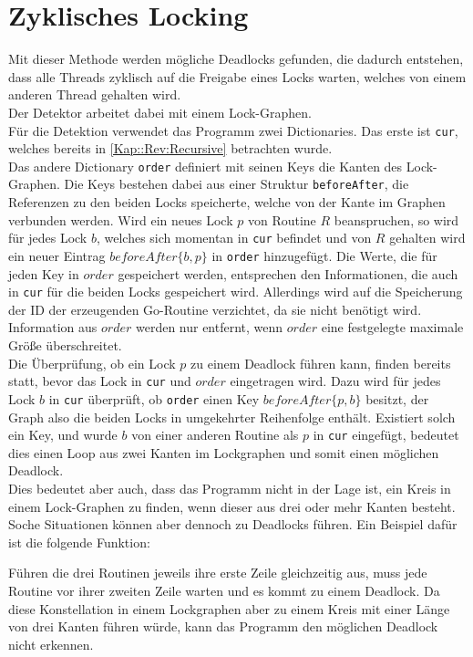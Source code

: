 \section{Zyklisches Locking}\label{Kap::Rev:Cyclic}
Mit dieser Methode werden mögliche Deadlocks gefunden, die dadurch entstehen,
dass alle Threads zyklisch auf die Freigabe eines Locks warten, welches von 
einem anderen Thread gehalten wird.\\ 
Der Detektor arbeitet dabei mit einem Lock-Graphen.\\
Für die Detektion verwendet das Programm zwei Dictionaries. Das erste ist \texttt{cur}, 
welches bereits in \ref{Kap::Rev:Recursive} betrachten wurde.\\
Das andere Dictionary \texttt{order} definiert mit seinen Keys die Kanten des Lock-Graphen.
Die Keys bestehen dabei aus einer Struktur \texttt{beforeAfter}, die Referenzen zu den beiden
Locks speicherte, welche von der Kante im Graphen verbunden werden.
Wird ein neues Lock $p$ von Routine $R$ beanspruchen, so wird für 
jedes Lock $b$, welches sich momentan in \texttt{cur} befindet und von $R$ gehalten wird ein  
neuer Eintrag $beforeAfter\{b, p\}$ in \texttt{order} hinzugefügt. 
Die Werte, die für jeden Key in $order$ gespeichert werden, entsprechen 
den Informationen, die auch in \texttt{cur} für die beiden Locks gespeichert wird. Allerdings 
wird auf die Speicherung der ID der erzeugenden Go-Routine verzichtet, da sie 
nicht benötigt wird.
Information aus $order$ werden nur entfernt, wenn $order$ eine festgelegte 
maximale Größe überschreitet.\\ 
Die Überprüfung, ob ein Lock $p$ zu einem Deadlock führen kann, finden bereits statt,
bevor das Lock in \texttt{cur} und $order$ eingetragen wird. Dazu wird für jedes Lock
$b$ in \texttt{cur} überprüft,
ob \texttt{order} einen Key $beforeAfter\{p, b\}$ besitzt, der Graph also die beiden 
Locks in 
umgekehrter Reihenfolge enthält. Existiert solch ein Key, und wurde $b$ 
von einer anderen Routine als $p$ in \texttt{cur} eingefügt, bedeutet dies einen 
Loop aus zwei Kanten im Lockgraphen und somit einen möglichen Deadlock.\\
Dies bedeutet aber auch, dass das Programm nicht in der Lage ist, ein Kreis 
in einem Lock-Graphen zu finden, wenn dieser aus drei oder mehr Kanten besteht.
Soche Situationen können aber dennoch zu Deadlocks führen. Ein Beispiel dafür 
ist die folgende Funktion:
\begin{figure}[H]
    
\end{figure}
Führen die drei Routinen jeweils ihre erste Zeile gleichzeitig aus, muss jede 
Routine vor ihrer zweiten Zeile warten und es kommt zu einem Deadlock. Da diese
Konstellation in einem Lockgraphen aber zu einem Kreis mit einer Länge von drei 
Kanten führen würde, kann das Programm den möglichen Deadlock nicht erkennen.\\

